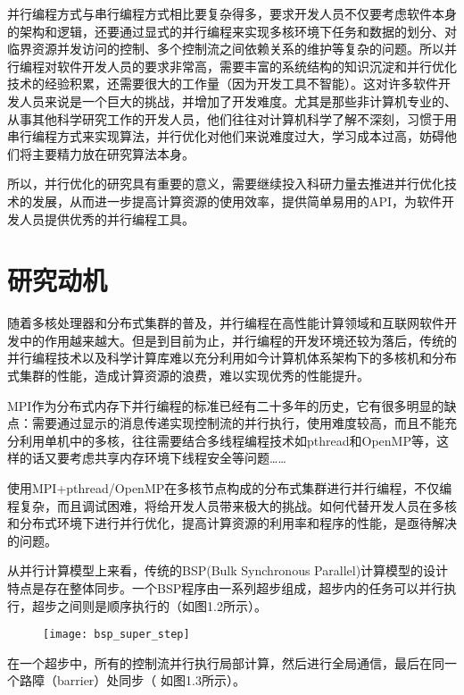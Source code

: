 并行编程方式与串行编程方式相比要复杂得多，要求开发人员不仅要考虑软件本身的架构和逻辑，还要通过显式的并行编程来实现多核环境下任务和数据的划分、对临界资源并发访问的控制、多个控制流之间依赖关系的维护等复杂的问题。所以并行编程对软件开发人员的要求非常高，需要丰富的系统结构的知识沉淀和并行优化技术的经验积累，还需要很大的工作量（因为开发工具不智能）。这对许多软件开发人员来说是一个巨大的挑战，并增加了开发难度。尤其是那些非计算机专业的、从事其他科学研究工作的开发人员，他们往往对计算机科学了解不深刻，习惯于用串行编程方式来实现算法，并行优化对他们来说难度过大，学习成本过高，妨碍他们将主要精力放在研究算法本身。

所以，并行优化的研究具有重要的意义，需要继续投入科研力量去推进并行优化技术的发展，从而进一步提高计算资源的使用效率，提供简单易用的API，为软件开发人员提供优秀的并行编程工具。

\section{研究动机}

随着多核处理器和分布式集群的普及，并行编程在高性能计算领域和互联网软件开发中的作用越来越大。但是到目前为止，并行编程的开发环境还较为落后，传统的并行编程技术以及科学计算库难以充分利用如今计算机体系架构下的多核机和分布式集群的性能，造成计算资源的浪费，难以实现优秀的性能提升。

MPI作为分布式内存下并行编程的标准已经有二十多年的历史，它有很多明显的缺点：需要通过显示的消息传递实现控制流的并行执行，使用难度较高，而且不能充分利用单机中的多核，往往需要结合多线程编程技术如pthread和OpenMP等，这样的话又要考虑共享内存环境下线程安全等问题\citep{hwu2008concurrency}……

使用MPI+pthread/OpenMP在多核节点构成的分布式集群进行并行编程，不仅编程复杂，而且调试困难，将给开发人员带来极大的挑战。如何代替开发人员在多核和分布式环境下进行并行优化，提高计算资源的利用率和程序的性能，是亟待解决的问题。

从并行计算模型上来看，传统的BSP(Bulk Synchronous Parallel)计算模型\citep{cheatham1996bulk}的设计特点是存在整体同步。一个BSP程序由一系列超步组成，超步内的任务可以并行执行，超步之间则是顺序执行的（如图1.2所示）。

\begin{figure}[!htbp]
    \centering
    \texttt{[image: bsp\_super\_step]}
    \label{fig:bsp_super_step}
\end{figure}

在一个超步中，所有的控制流并行执行局部计算，然后进行全局通信，最后在同一个路障（barrier）处同步（ 如图1.3所示）。

